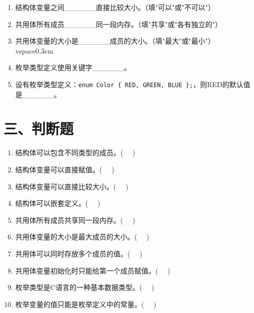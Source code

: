 \documentclass[a4paper,12pt]{article}
\begin{document}
\begin{enumerate}
	\item 结构体变量之间\_\_\_\_\_\_直接比较大小。（填"可以"或"不可以"）
	      \vspace{0.3cm}

	\item 共用体所有成员\_\_\_\_\_\_同一段内存。（填"共享"或"各有独立的"）
	      \vspace{0.3cm}

	\item 共用体变量的大小是\_\_\_\_\_\_成员的大小。（填"最大"或"最小"）
	      \\vspace{0.3cm}

	\item 枚举类型定义使用关键字\_\_\_\_\_\_。
	      \vspace{0.3cm}

	\item 设有枚举类型定义：\texttt{enum Color \{ RED, GREEN, BLUE \};}，则RED的默认值是\_\_\_\_\_\_。
	      \vspace{0.3cm}
\end{enumerate}

\section*{三、判断题}

\begin{enumerate}
	\item 结构体可以包含不同类型的成员。( \ \ )
	      \vspace{0.3cm}

	\item 结构体变量可以直接赋值。( \ \ )
	      \vspace{0.3cm}

	\item 结构体变量可以直接比较大小。( \ \ )
	      \vspace{0.3cm}

	\item 结构体可以嵌套定义。( \ \ )
	      \vspace{0.3cm}

	\item 共用体所有成员共享同一段内存。( \ \ )
	      \vspace{0.3cm}

	\item 共用体变量的大小是最大成员的大小。( \ \ )
	      \vspace{0.3cm}

	\item 共用体可以同时存放多个成员的值。( \ \ )
	      \vspace{0.3cm}

	\item 共用体变量初始化时只能给第一个成员赋值。( \ \ )
	      \vspace{0.3cm}

	\item 枚举类型是C语言的一种基本数据类型。( \ \ )
	      \vspace{0.3cm}

	\item 枚举变量的值只能是枚举定义中的常量。( \ \ )
	      \vspace{0.3cm}
\end{enumerate}
\end{document}
